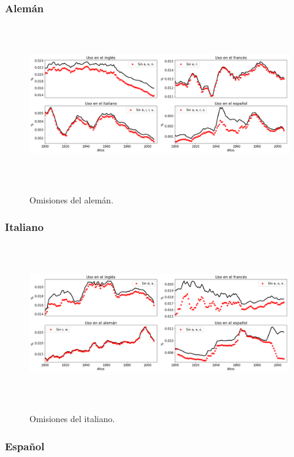\newpage
\subsubsection*{Alemán}

\begin{figure}[h!]
	\centering
	\includegraphics[width=14.5cm, height=6.8cm]{Cap_5/OM_GE.png}
	\label{fig.OM_GE}
	\caption{Omisiones del alemán.}
\end{figure}


\subsubsection*{Italiano}

\begin{figure}[h!]
	\centering
	\includegraphics[width=14.5cm, height=6.8cm]{Cap_5/OM_IT.png}
	\label{fig.OM_IT}
	\caption{Omisiones del italiano.}
\end{figure}

\newpage
\subsubsection*{Español}

